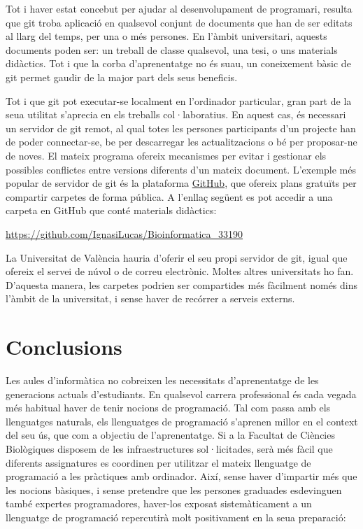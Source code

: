 \documentclass[a4paper,12pt]{article}
\begin{document}
Tot i haver estat concebut per ajudar al desenvolupament de programari, resulta que \textsf{git}
troba aplicació en qualsevol conjunt de documents que han de ser editats al llarg del temps,
per una o més persones. En l'àmbit universitari, aquests documents poden ser: un treball de
classe qualsevol, una tesi, o uns materials didàctics. Tot i que la corba d'aprenentatge no és
suau, un coneixement bàsic de \textsf{git} permet gaudir de la major part dels seus beneficis.

Tot i que \textsf{git} pot executar-se localment en l'ordinador particular, gran part de la
seua utilitat s'aprecia en els treballs col·laboratius. En aquest cas, és necessari un
servidor de \textsf{git} remot, al qual totes les persones participants d'un projecte han
de poder connectar-se, be per descarregar les actualitzacions o bé per proposar-ne de noves.
El mateix programa ofereix mecanismes per evitar i gestionar els possibles conflictes entre
versions diferents d'un mateix document. L'exemple més popular de servidor de \textsf{git}
és la plataforma \href{https://github.com}{GitHub}, que ofereix plans gratuïts per compartir
carpetes de forma pública. A l'enllaç següent es pot accedir a una carpeta en GitHub que
conté materials didàctics:

\href{https://github.com/IgnasiLucas/Bioinformatica\_33190}{https://github.com/IgnasiLucas/Bioinformatica\_33190}

La Universitat de València hauria d'oferir el seu propi servidor de \textsf{git}, igual que
ofereix el servei de núvol o de correu electrònic. Moltes altres universitats ho fan. D'aquesta
manera, les carpetes podrien ser compartides més fàcilment només dins l'àmbit de la universitat,
i sense haver de recórrer a serveis externs.

\section{Conclusions}
Les aules d'informàtica no cobreixen les necessitats d'aprenentatge de les generacions actuals
d'estudiants. En qualsevol carrera professional és cada vegada més habitual haver de tenir nocions
de programació. Tal com passa amb els llenguatges naturals, els llenguatges de programació
s'aprenen millor en el context del seu ús, que com a objectiu de l'aprenentatge. Si a la
Facultat de Ciències Biològiques disposem de les infraestructures sol·licitades, serà més
fàcil que diferents assignatures es coordinen per utilitzar el mateix llenguatge de programació
a les pràctiques amb ordinador. Així, sense haver d'impartir més que les nocions bàsiques,
i sense pretendre que les persones graduades esdevinguen també expertes programadores, haver-los
exposat sistemàticament a un llenguatge de programació repercutirà molt positivament en la seua
preparació:
\end{document}
